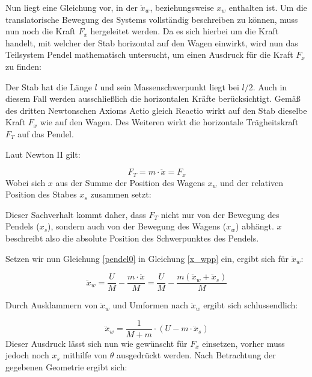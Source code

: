 Nun liegt eine Gleichung vor, in der $\ddot{x}_w$, beziehungsweise $x_w$ enthalten ist. Um die translatorische Bewegung des Systems vollständig beschreiben zu können, muss nun noch die Kraft $F_x$ hergeleitet werden. Da es sich hierbei um die Kraft handelt, mit welcher der Stab horizontal auf den Wagen einwirkt, wird nun das Teilsystem Pendel mathematisch untersucht, um einen Ausdruck für die Kraft $F_x$ zu finden:


Der Stab hat die Länge $l$ und sein Massenschwerpunkt liegt bei $l/2$. Auch in diesem Fall werden ausschließlich die horizontalen Kräfte berücksichtigt. Gemäß des dritten Newtonschen Axioms Actio gleich Reactio wirkt auf den Stab dieselbe Kraft $F_x$ wie auf den Wagen. Des Weiteren wirkt die horizontale Trägheitskraft $F_T$ auf das Pendel.

Laut Newton II gilt:

\begin{equation}
F_T = m \cdot \ddot{x} = F_x
\label{pendel0}
\end{equation}
Wobei sich $x$ aus der Summe der Position des Wagens $x_w$ und der relativen Position
des Stabes $x_s$ zusammen setzt:


Dieser Sachverhalt kommt daher, dass $F_T$  nicht nur von der Bewegung des Pendels ($x_s$), sondern auch von der Bewegung des Wagens ($x_w$) abhängt. $x$ beschreibt also die absolute Position des Schwerpunktes des Pendels.

Setzen wir nun Gleichung \ref{pendel0} in Gleichung \ref{x_wpp} ein, ergibt sich für $\ddot{x}_w$:

\begin{equation}
\ddot{x}_w =  \frac{U}{M} - \frac{m \cdot \ddot{x}}{M}=\frac{U}{M} - \frac{m(\ddot{x}_w+\ddot{x}_s)}{M}
\label{x_wpp2}
\end{equation}

Durch Ausklammern von $\ddot{x}_w$ und Umformen nach $\ddot{x}_w$ ergibt sich schlussendlich: 

\begin{equation}
\ddot{x}_w =  \frac{1}{M+m} \cdot (U-m\cdot \ddot{x}_s) 
\label{x_wpp3}
\end{equation}
Dieser Ausdruck lässt sich nun wie gewünscht für $F_x$ einsetzen, vorher muss jedoch noch $x_s$ mithilfe von $\theta$ ausgedrückt werden. Nach Betrachtung der gegebenen Geometrie ergibt sich:

